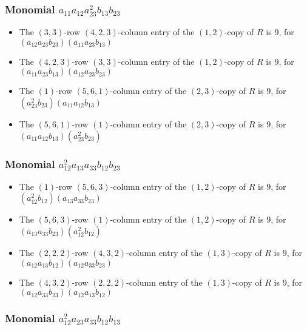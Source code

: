 \documentclass{article}
\begin{document}
\subsubsection{Monomial $ a_{11} a_{12} a_{23}^{2} b_{13} b_{23} $}

\begin{itemize}
\item The $(3, 3)$-row $(4, 2, 3)$-column entry of the $ \left(1, 2\right) $-copy of $R$ is $ 9 $, for $( a_{12} a_{23} b_{23} )( a_{11} a_{23} b_{13} )$ 
\item The $(4, 2, 3)$-row $(3, 3)$-column entry of the $ \left(1, 2\right) $-copy of $R$ is $ 9 $, for $( a_{11} a_{23} b_{13} )( a_{12} a_{23} b_{23} )$ 
\item The $(1)$-row $(5, 6, 1)$-column entry of the $ \left(2, 3\right) $-copy of $R$ is $ 9 $, for $( a_{23}^{2} b_{23} )( a_{11} a_{12} b_{13} )$ 
\item The $(5, 6, 1)$-row $(1)$-column entry of the $ \left(2, 3\right) $-copy of $R$ is $ 9 $, for $( a_{11} a_{12} b_{13} )( a_{23}^{2} b_{23} )$ 
\end{itemize}
\subsubsection{Monomial $ a_{12}^{2} a_{13} a_{33} b_{12} b_{23} $}

\begin{itemize}
\item The $(1)$-row $(5, 6, 3)$-column entry of the $ \left(1, 2\right) $-copy of $R$ is $ 9 $, for $( a_{12}^{2} b_{12} )( a_{13} a_{33} b_{23} )$ 
\item The $(5, 6, 3)$-row $(1)$-column entry of the $ \left(1, 2\right) $-copy of $R$ is $ 9 $, for $( a_{13} a_{33} b_{23} )( a_{12}^{2} b_{12} )$ 
\item The $(2, 2, 2)$-row $(4, 3, 2)$-column entry of the $ \left(1, 3\right) $-copy of $R$ is $ 9 $, for $( a_{12} a_{13} b_{12} )( a_{12} a_{33} b_{23} )$ 
\item The $(4, 3, 2)$-row $(2, 2, 2)$-column entry of the $ \left(1, 3\right) $-copy of $R$ is $ 9 $, for $( a_{12} a_{33} b_{23} )( a_{12} a_{13} b_{12} )$ 
\end{itemize}
\subsubsection{Monomial $ a_{12}^{2} a_{23} a_{33} b_{12} b_{13} $}
\end{document}
